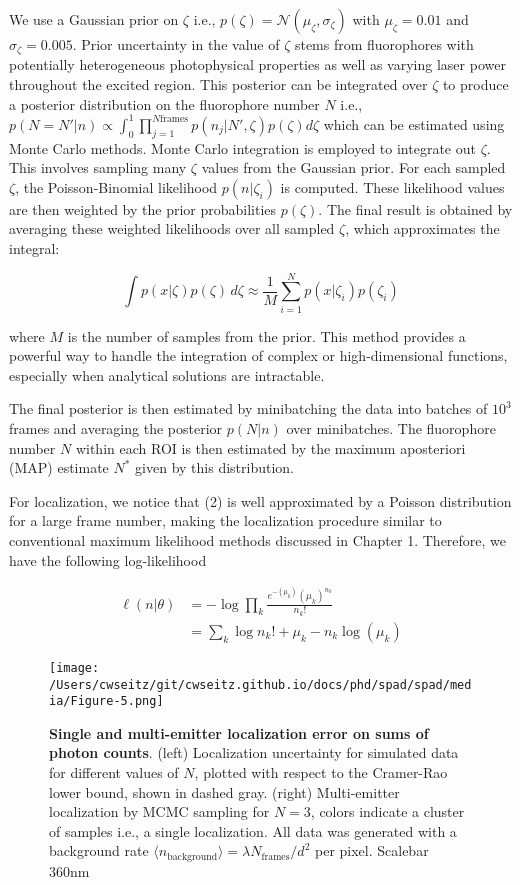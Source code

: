 We use a Gaussian prior on $\zeta$ i.e., $p(\zeta) = \mathcal{N}(\mu_{\zeta},\sigma_{\zeta})$ with $\mu_{\zeta}=0.01$ and $\sigma_{\zeta}=0.005$. Prior uncertainty in the value of $\zeta$ stems from fluorophores with potentially heterogeneous photophysical properties as well as varying laser power throughout the excited region. This posterior can be integrated over $\zeta$ to produce a posterior distribution on the fluorophore number $N$ i.e., $p(N=N'\lvert n) \propto \int_{0}^{1} \prod_{j=1}^{N\mathrm{frames}} p(n_{j}\lvert N',\zeta)p(\zeta) d\zeta$ which can be estimated using Monte Carlo methods. Monte Carlo integration is employed to integrate out $\zeta$. This involves sampling many $\zeta$ values from the Gaussian prior. For each sampled $\zeta$, the Poisson-Binomial likelihood $p(n\lvert\zeta_i)$ is computed. These likelihood values are then weighted by the prior probabilities $p(\zeta)$. The final result is obtained by averaging these weighted likelihoods over all sampled $\zeta$, which approximates the integral:

\begin{equation*}
\int p(x\lvert\zeta) p(\zeta) \, d\zeta \approx \frac{1}{M} \sum_{i=1}^N p(x\lvert\zeta_i) p(\zeta_i)
\end{equation*}

where $M$ is the number of samples from the prior. This method provides a powerful way to handle the integration of complex or high-dimensional functions, especially when analytical solutions are intractable.

The final posterior is then estimated by minibatching the data into batches of $10^3$ frames and averaging the posterior $p(N\lvert n)$ over minibatches. The fluorophore number $N$ within each ROI is then estimated by the maximum aposteriori (MAP) estimate $N^{*}$ given by this distribution.

For localization, we notice that (2) is well approximated by a Poisson distribution for a large frame number, making the localization procedure similar to conventional maximum likelihood methods discussed in Chapter 1. Therefore, we have the following log-likelihood


\begin{align}
\ell(n\lvert \theta) &= -\log \prod_{k} \frac{e^{-\left(\mu_{k}\right)}\left(\mu_{k}\right)^{n_k}}{n_k!}\\
&= \sum_{k}  \log n_k! + \mu_{k} - n_k\log\left(\mu_{k}\right)
\end{align}

\begin{figure*}[t]
\centering
\texttt{[image: /Users/cwseitz/git/cwseitz.github.io/docs/phd/spad/spad/media/Figure-5.png]}
\caption{\textbf{Single and multi-emitter localization error on sums of photon counts}. (left) Localization uncertainty for simulated data for different values of $N$, plotted with respect to the Cramer-Rao lower bound, shown in dashed gray. (right) Multi-emitter localization by MCMC sampling for $N=3$, colors indicate a cluster of samples i.e., a single localization. All data was generated with a background rate $\langle n_{\mathrm{background}} \rangle = \lambda N_{\mathrm{frames}}/d^{2}$ per pixel. Scalebar 360nm}
\label{fig:fig6}
\end{figure*}   

